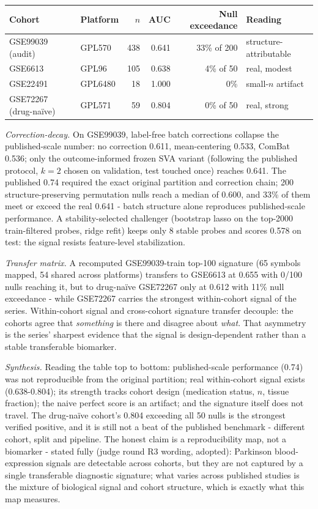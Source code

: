 \begin{center}\begin{tabular}{llrrrl}\toprule
Cohort & Platform & $n$ & AUC & Null exceedance & Reading\\\midrule
GSE99039 (audit) & GPL570 & 438 & 0.641 & 33\% of 200 & structure-attributable\\
GSE6613 & GPL96 & 105 & 0.638 & 4\% of 50 & real, modest\\
GSE22491 & GPL6480 & 18 & 1.000 & 0\% & small-$n$ artifact\\
GSE72267 (drug-na\"ive) & GPL571 & 59 & 0.804 & 0\% of 50 & real, strong\\
\bottomrule\end{tabular}\end{center}

\emph{Correction-decay.} On GSE99039, label-free batch corrections collapse
the published-scale number: no correction 0.611, mean-centering 0.533, ComBat
0.536; only the outcome-informed frozen SVA variant (following the published
protocol, $k=2$ chosen on validation, test touched once) reaches 0.641. The
published 0.74 required the exact original partition and correction chain;
200 structure-preserving permutation nulls reach a median of 0.600, and 33\%
of them meet or exceed the real 0.641 - batch structure alone reproduces
published-scale performance. A stability-selected challenger (bootstrap lasso
on the top-2000 train-filtered probes, ridge refit) keeps only 8 stable probes
and scores 0.578 on test: the signal resists feature-level stabilization.

\emph{Transfer matrix.} A recomputed GSE99039-train top-100 signature (65
symbols mapped, 54 shared across platforms) transfers to GSE6613 at 0.655 with
0/100 nulls reaching it, but to drug-na\"ive GSE72267 only at 0.612 with 11\%
null exceedance - while GSE72267 carries the strongest within-cohort signal of
the series. Within-cohort signal and cross-cohort signature transfer decouple:
the cohorts agree that \emph{something} is there and disagree about
\emph{what}. That asymmetry is the series' sharpest evidence that the signal
is design-dependent rather than a stable transferable biomarker.

\emph{Synthesis.} Reading the table top to bottom: published-scale performance
(0.74) was not reproducible from the original partition; real within-cohort
signal exists (0.638-0.804); its strength tracks cohort design (medication
status, $n$, tissue fraction); the naive perfect score is an artifact; and the
signature itself does not travel. The drug-na\"ive cohort's 0.804 exceeding all
50 nulls is the strongest verified positive, and it is still not a beat of the
published benchmark - different cohort, split and pipeline. The honest
claim is a reproducibility map, not a biomarker - stated fully (judge round
R3 wording, adopted): Parkinson blood-expression signals are detectable across
cohorts, but they are not captured by a single transferable diagnostic
signature; what varies across published studies is the mixture of biological
signal and cohort structure, which is exactly what this map measures.

